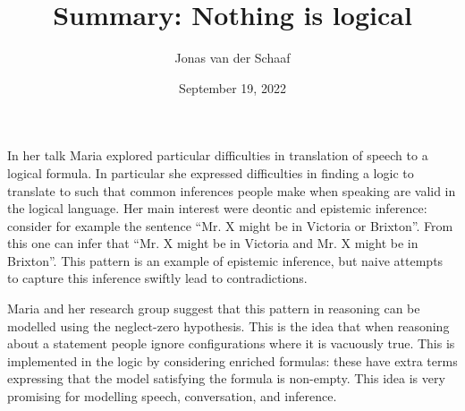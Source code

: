 \documentclass{article}
\title{Summary: Nothing is logical}
\date{September 19, 2022}
\author{Jonas van der Schaaf}
\begin{document}
\maketitle

In her talk Maria explored particular difficulties in translation of speech to a
logical formula. In particular she expressed difficulties in finding a logic to
translate to such that common inferences people make when speaking are valid in
the logical language. Her main interest were deontic and epistemic inference:
consider for example the sentence ``Mr. X might be in Victoria or Brixton''.
From this one can infer that ``Mr. X might be in Victoria and Mr. X might be in
Brixton''. This pattern is an example of epistemic inference, but naive attempts
to capture this inference swiftly lead to contradictions.

Maria and her research group suggest that this pattern in reasoning can be
modelled using the neglect-zero hypothesis. This is the idea that when reasoning
about a statement people ignore configurations where it is vacuously true. This
is implemented in the logic by considering enriched formulas: these have extra
terms expressing that the model satisfying the formula is non-empty. This idea
is very promising for modelling speech, conversation, and inference.
\end{document}
